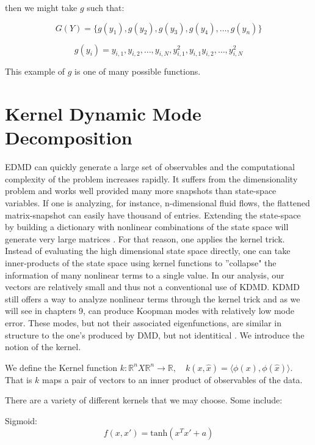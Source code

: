 \noindent then we might take $g$ such that:

$$
G(Y) = \{g(y_1), g(y_2), g(y_3), g(y_4), \dots , g(y_n)\}
$$

$$
g(y_i) = {y_{i,1}, y_{i,2},\dots, y_{i,N}, y^{2}_{i,1}, y_{i,1}y_{i,2}, \dots, y^{2}_{i,N}} 
$$

\noindent This example of $g$ is one of many possible functions.

\section{Kernel Dynamic Mode Decomposition}

EDMD can quickly generate a large set of observables
 and the computational complexity of the problem increases rapidly. It suffers from the
 dimensionality problem and works well provided many more snapshots than state-space
variables. If one is analyzing, for instance, n-dimensional fluid flows, the flattened matrix-snapshot
can easily have thousand of entries. Extending the state-space by building a dictionary with nonlinear combinations of the 
state space will generate very large matrices \cite{williams2015kernelbased}. For that reason, one applies the kernel trick. Instead of evaluating
the high dimensional state space directly, one can take inner-products of the state space using kernel functions
to ''collapse" the information of many nonlinear terms to a single value. In our analysis, our vectors are relatively small and thus not a conventional use of KDMD. 
 KDMD still offers a way to analyze nonlinear terms through the kernel trick and as we will see in chapters 9, can produce 
 Koopman modes with relatively low mode error. 
 These modes, but not their associated eigenfunctions, are similar in structure to the one's produced by DMD, but not identitical \cite{doi:10.1137/1.9781611974508}. 
We introduce the notion of the kernel.

\begin{dfn}
    We define the Kernel function $k:\mathbb{R}^n X \mathbb{R}^n \rightarrow \mathbb{R}, \quad k(x,{\hat x}) = \langle \phi(x), \phi({\hat x})\rangle$.
     That is $k$ maps a pair of vectors to an inner product of observables of the data.
\end{dfn}

\noindent There are a variety of different kernels that we may choose. Some include:

\vspace{3mm}

\noindent Sigmoid:
$$
f(x,x') = \text{tanh}(x^Tx' + a)
$$

